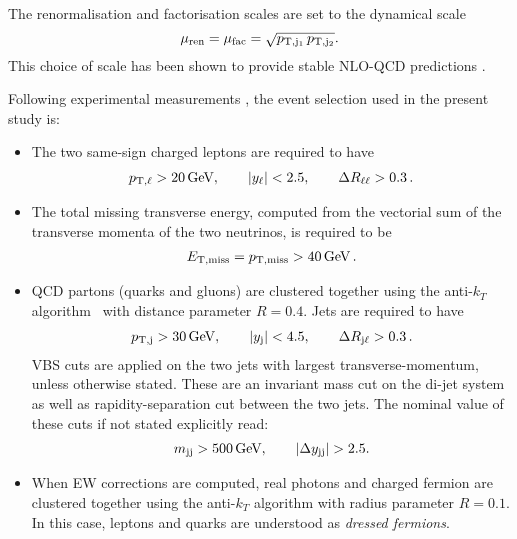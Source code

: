 The renormalisation and factorisation scales are set to the dynamical scale
%
\begin{equation}
\label{eq:defscale}
 \mu_{\rm ren} = \mu_{\rm fac} = \sqrt{p_{\rm T, j_1}\, p_{\rm T, j_2}}.
\end{equation}
%
This choice of scale has been shown to provide stable NLO-QCD predictions \cite{Denner:2012dz}.

Following experimental measurements \cite{Aad:2014zda,Aaboud:2016ffv,Khachatryan:2014sta,CMS:2017adb}, the event selection used in the present study is:

\begin{itemize}
    \item The two same-sign charged leptons are required to have
        \begin{align}
        \label{cut:1}
         p_{\text{T},\ell} >  20\,\text{GeV},\qquad |y_{\ell}| < 2.5, \qquad \Delta R_{\ell\ell}> 0.3\,.
        \end{align}
    \item The total missing transverse energy, computed from the vectorial sum of the transverse momenta of the two neutrinos, is required to be
        \begin{align}
        \label{cut:2}
          E_{\text{T},\text{miss}}=p_{\rm T, miss} >  40\,\text{GeV}\,.
        \end{align}
    \item QCD partons (quarks and gluons) are clustered together using the anti-$k_T$ algorithm~\cite{Cacciari:2008gp} with distance parameter $R=0.4$. Jets are required
        to have
        \begin{align}
        \label{cut:3}
         p_{\text{T},\text{j}} >  30\,\text{GeV}, \qquad |y_\text{j}| < 4.5, \qquad \Delta R_{\text{j}\ell} > 0.3 \,.
        \end{align}
        VBS cuts are applied on the two jets with largest transverse-momentum, unless otherwise stated.
        These are an in\-vari\-ant mass cut on the di-jet system as well as rapidity-separation cut between the two jets.
        The nominal value of these cuts if not stated explicitly read:
        \begin{align}
        \label{cut:4}
         m_{\text{j} \text{j}} >  500\,\text{GeV},\qquad |\Delta y_{\text{j} \text{j}}| > 2.5.
        \end{align}
    \item When EW corrections are computed, real photons and charged fermion are clustered together using the anti-$k_T$ algorithm with
        radius parameter $R=0.1$. In this case, leptons and quarks are understood as {\it dressed fermions}.
\end{itemize}
